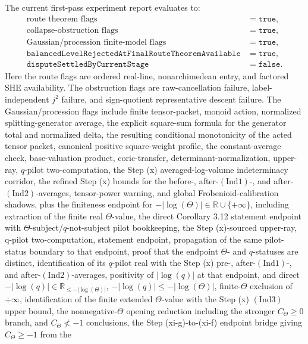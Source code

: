 \documentclass[11pt]{article}
\begin{document}
The current first-pass experiment report evaluates to:
\[
\begin{array}{ll}
\text{route theorem flags} & = \texttt{true},\\
\text{collapse-obstruction flags} & = \texttt{true},\\
\text{Gaussian/procession finite-model flags} & = \texttt{true},\\
\texttt{balancedLevelRejectedAtFinalRouteTheoremAvailable} & = \texttt{true},\\
\texttt{disputeSettledByCurrentStage} & = \texttt{false}.
\end{array}
\]
Here the route flags are ordered real-line, nonarchimedean entry, and factored
SHE availability.  The obstruction flags are raw-cancellation failure,
label-independent \(j^2\) failure, and sign-quotient representative descent
failure.  The Gaussian/procession flags include finite tensor-packet, monoid
action, normalized splitting-generator average, the explicit square-sum formula
for the generator total and normalized delta, the resulting conditional
monotonicity of the acted tensor packet, canonical positive square-weight
profile, the constant-average check,
base-valuation product,
coric-transfer, determinant-normalization,
upper-ray, \(q\)-pilot two-computation, the Step (x) averaged-log-volume
indeterminacy corridor, the refined Step (x) bounds for the before-,
after-\((\mathrm{Ind1})\)-, and after-\((\mathrm{Ind2})\)-averages,
tensor-power warning, and global Frobenioid-calibration
shadows, plus the finiteness endpoint for
\(-|\log(\Theta)|\in\mathbb{R}\cup\{+\infty\}\), including extraction of the
finite real \(\Theta\)-value, the direct
Corollary 3.12 statement endpoint with \(\Theta\)-subject/\(q\)-not-subject
pilot bookkeeping, the Step (x)-sourced upper-ray, q-pilot two-computation,
statement endpoint, propagation of the same pilot-status boundary to that
endpoint, proof that the endpoint \(\Theta\)- and \(q\)-statuses are distinct,
identification of its \(q\)-pilot real with the Step (x)
pre-, after-\((\mathrm{Ind1})\)-, and after-\((\mathrm{Ind2})\)-averages,
positivity of \(|\log(q)|\) at that endpoint, and direct
\(-|\log(q)|\in\mathbb{R}_{\le-|\log(\Theta)|}\),
\(-|\log(q)|\le-|\log(\Theta)|\), finite-\(\Theta\) exclusion of \(+\infty\),
identification of the finite extended \(\Theta\)-value with the Step (x)
\((\mathrm{Ind3})\) upper bound, the nonnegative-\(\Theta\) opening reduction
including the stronger \(C_\Theta\ge0\) branch, and \(C_\Theta\nless-1\)
conclusions,
the
Step (xi-g)-to-(xi-f) endpoint bridge giving \(C_\Theta\ge-1\) from the
\end{document}
